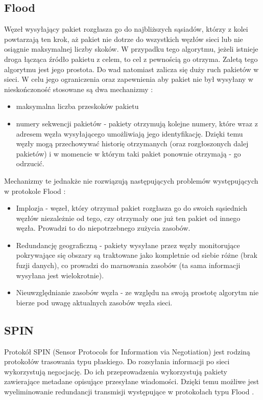 \subsection{Flood}
Węzeł wysyłający pakiet rozgłasza go do najbliższych sąsiadów, którzy z kolei powtarzają ten krok, aż pakiet nie dotrze do wszystkich węzłów sieci lub nie osiągnie maksymalnej liczby skoków.
W przypadku tego algorytmu, jeżeli istnieje droga łącząca źródło pakietu z celem, to cel z pewnością go otrzyma.
Zaletą tego algorytmu jest jego prostota. Do wad natomiast zalicza się duży ruch pakietów w sieci. W celu jego ograniczenia oraz zapewnienia aby pakiet nie był wysyłany w nieskończoność stosowane są dwa mechanizmy \cite{Dargie2010}:
\begin{itemize}
	\item maksymalna liczba przeskoków pakietu
	\item numery sekwencji pakietów - pakiety otrzymują kolejne numery, które wraz z adresem węzła wysyłającego umożliwiają jego identyfikację. Dzięki temu węzły mogą przechowywać historię otrzymanych (oraz rozgłoszonych dalej pakietów) i w momencie w którym taki pakiet ponownie otrzymają - go odrzucić.
\end{itemize}

Mechanizmy te jednakże nie rozwiązują następujących problemów występujących w protokole Flood \cite{Dargie2010}:
\begin{itemize}
	\item Implozja - węzeł, który otrzymał pakiet rozgłasza go do swoich sąsiednich węzłów niezależnie od tego, czy otrzymały one już ten pakiet od innego węzła. Prowadzi to do niepotrzebnego zużycia zasobów. %
	\item Redundancję geograficzną - pakiety wysyłane przez węzły monitorujące pokrywające się obszary są traktowane jako kompletnie od siebie różne (brak fuzji danych), co prowadzi do marnowania zasobów (ta sama informacji wysyłana jest wielokrotnie). %
	\item Nieuwzględnianie zasobów węzła - ze względu na swoją prostotę algorytm nie bierze pod uwagę aktualnych zasobów węzła sieci.
\end{itemize}
\subsection{SPIN}
Protokół SPIN (Sensor Protocols for Information via Negotiation) jest rodziną protokołów trasowania typu płaskiego. Do rozsyłania informacji po sieci wykorzystują negocjację. Do ich przeprowadzenia wykorzystują pakiety zawierające metadane opisujące przesyłane wiadomości. Dzięki temu możliwe jest wyeliminowanie redundancji transmisji występujące w protokołach typu Flood \cite{Chaudhary2015}.

